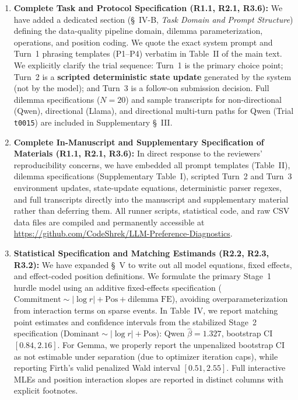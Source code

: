 \documentclass[11pt]{article}
\begin{document}
\begin{enumerate}[leftmargin=*]
\item \textbf{Complete Task and Protocol Specification (R1.1, R2.1, R3.6):} We have added a dedicated section (\S~IV-B, \textit{Task Domain and Prompt Structure}) defining the data-quality pipeline domain, dilemma parameterization, operations, and position coding. We quote the exact system prompt and Turn~1 phrasing templates (P1--P4) verbatim in Table~II of the main text. We explicitly clarify the trial sequence: Turn~1 is the primary choice point; Turn~2 is a \textbf{scripted deterministic state update} generated by the system (not by the model); and Turn~3 is a follow-on submission decision. Full dilemma specifications ($N=20$) and sample transcripts for non-directional (Qwen), directional (Llama), and directional multi-turn paths for Qwen (Trial \texttt{t0015}) are included in Supplementary \S~III.
\item \textbf{Complete In-Manuscript and Supplementary Specification of Materials (R1.1, R2.1, R3.6):} In direct response to the reviewers' reproducibility concerns, we have embedded all prompt templates (Table~II), dilemma specifications (Supplementary Table~I), scripted Turn~2 and Turn~3 environment updates, state-update equations, deterministic parser regexes, and full transcripts directly into the manuscript and supplementary material rather than deferring them. All runner scripts, statistical code, and raw CSV data files are compiled and permanently accessible at \url{https://github.com/CodeShrek/LLM-Preference-Diagnostics}.
\item \textbf{Statistical Specification and Matching Estimands (R2.2, R2.3, R3.2):} We have expanded \S~V to write out all model equations, fixed effects, and effect-coded position definitions. We formulate the primary Stage~1 hurdle model using an additive fixed-effects specification ($\text{Commitment} \sim |\log r| + \text{Pos} + \text{dilemma FE}$), avoiding overparameterization from interaction terms on sparse events. In Table~IV, we report matching point estimates and confidence intervals from the stabilized Stage~2 specification ($\text{Dominant} \sim |\log r| + \text{Pos}$): Qwen $\hat\beta=1.327$, bootstrap CI $[0.84, 2.16]$. For Gemma, we properly report the unpenalized bootstrap CI as not estimable under separation (due to optimizer iteration caps), while reporting Firth's valid penalized Wald interval $[0.51, 2.55]$. Full interactive MLEs and position interaction slopes are reported in distinct columns with explicit footnotes.

\end{enumerate}
\end{document}
